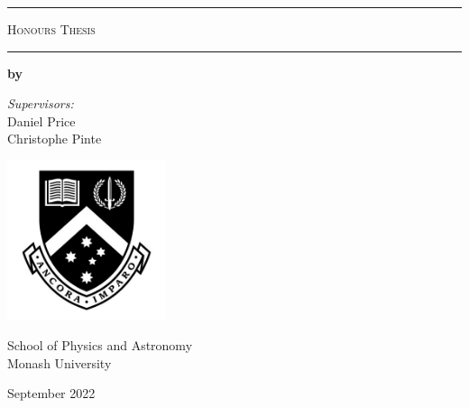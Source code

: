 \begin{titlepage}
    \begin{center}
        \par\noindent\rule{\textwidth}{0.8pt}
       
        \vspace*{1cm}

        \makeatletter
        {\LARGE\textbf{\@title}}

        \vspace{0.5cm}

        \textsc{Honours Thesis}

        \vspace{0.4cm}

        \par\noindent\rule{\textwidth}{0.8pt}
       
        \vspace{0.9cm}

        {\Large\textbf{by \@author}} \\
        \makeatother
        
        \vspace{0.75cm}
        
        \textit{Supervisors:} \\
        Daniel Price \\
        Christophe Pinte

        \vfill
        
        \includegraphics[width=0.35\textwidth]{images/monash_logo.jpg}
        
            
        School of Physics and Astronomy\\
        Monash University\\
        
        \vspace{1.0cm}
        
        {\large September 2022}
            
    \end{center}
\end{titlepage}